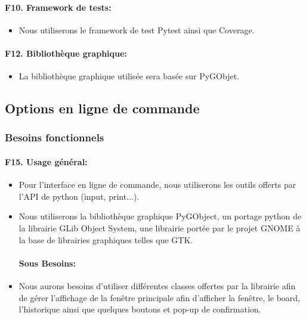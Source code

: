 \documentclass[a4paper,12pt]{article}
\begin{document}
\paragraph{F10. Framework de tests:}
\begin{itemize}
  \item Nous utiliserons le framework de test Pytest ainsi que Coverage.
\end{itemize}

\paragraph{F12. Bibliothèque graphique:}
\begin{itemize}
  \item La bibliothèque graphique utilisée sera basée sur PyGObjet.
\end{itemize}

\subsection{Options en ligne de commande}

\subsubsection{Besoins fonctionnels}

\paragraph{F15. Usage général:}
\begin{itemize}
  \item Pour l'interface en ligne de commande, nous utiliserons les outils offerts par
        l'API de python (input, print...).
  \item Nous utiliserons la bibliothèque graphique PyGObject, un portage python de la
        librairie GLib Object System, une librairie portée par le projet GNOME à la
        base de librairies graphiques telles que GTK.
        \paragraph{Sous Besoins:}
  \item Nous aurons besoins d'utiliser différentes classes offertes par la librairie
        afin de gérer l'affichage de la fenêtre principale afin d'afficher la fenêtre,
        le board, l'historique ainsi que quelques boutons et pop-up de confirmation.
\end{itemize}
\end{document}
